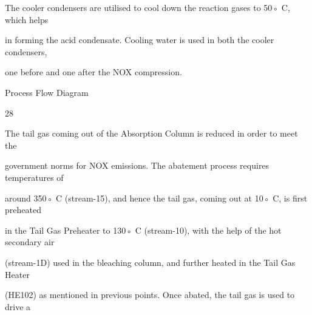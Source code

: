 \documentclass[a4paper,portrait,12pt]{article}
\begin{document}
\begin{flushleft}
The cooler condensers are utilised to cool down the reaction gases to 50◦ C, which helps
\end{flushleft}


\begin{flushleft}
in forming the acid condensate. Cooling water is used in both the cooler condensers,
\end{flushleft}


\begin{flushleft}
one before and one after the NOX compression.
\end{flushleft}





\begin{flushleft}
\newpage
Process Flow Diagram
\end{flushleft}





28





\begin{flushleft}
The tail gas coming out of the Absorption Column is reduced in order to meet the
\end{flushleft}


\begin{flushleft}
government norms for NOX emissions. The abatement process requires temperatures of
\end{flushleft}


\begin{flushleft}
around 350◦ C (stream-15), and hence the tail gas, coming out at 10◦ C, is first preheated
\end{flushleft}


\begin{flushleft}
in the Tail Gas Preheater to 130◦ C (stream-10), with the help of the hot secondary air
\end{flushleft}


\begin{flushleft}
(stream-1D) used in the bleaching column, and further heated in the Tail Gas Heater
\end{flushleft}


\begin{flushleft}
(HE102) as mentioned in previous points. Once abated, the tail gas is used to drive a
\end{flushleft}
\end{document}

